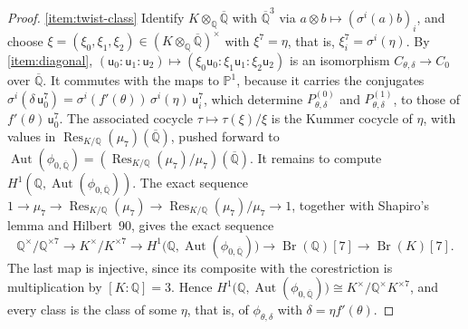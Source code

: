 \documentclass[12pt]{amsart}
\renewcommand{\P}{\mathbb{P}}
\newcommand{\Q}{\mathbb{Q}}
\newcommand{\Qbar}{{\overline{\Q}}}
\newcommand{\Pone}{\P^{1}}
\newcommand{\sfu}{\mathsf{u}}
\DeclareMathOperator{\Aut}{Aut}
\DeclareMathOperator{\Br}{Br}
\DeclareMathOperator{\Res}{Res}
\numberwithin{equation}{section}
\theoremstyle{definition}
\begin{document}
\begin{proof}
  \eqref{item:twist-class} Identify $K \otimes_{\Q} \Qbar$ with $\Qbar^{3}$ via
  $a \otimes b \mapsto (\sigma^{i}(a)b)_i$, and choose $\xi =
  (\xi_0,\xi_1,\xi_2) \in (K \otimes_{\Q} \Qbar)^{\times}$ with
  $\xi^7 = \eta$, that is, $\xi_i^7 = \sigma^{i}(\eta)$. By
  \eqref{item:diagonal}, $(\sfu_0:\sfu_1:\sfu_2) \mapsto
  (\xi_0\sfu_0:\xi_1\sfu_1:\xi_2\sfu_2)$ is an isomorphism
  $C_{\theta,\delta} \to C_0$ over $\Qbar$. It commutes with the maps to
  $\Pone$, because it carries the conjugates $\sigma^{i}(\delta\,\sfu_0^7) =
  \sigma^{i}(f'(\theta))\,\sigma^{i}(\eta)\,\sfu_i^7$, which determine
  $P^{(0)}_{\theta,\delta}$ and $P^{(1)}_{\theta,\delta}$, to those of
  $f'(\theta)\,\sfu_0^7$. The associated cocycle $\tau \mapsto \tau(\xi)/\xi$
  is the Kummer cocycle of $\eta$, with values in $\Res_{K/\Q}(\mu_7)(\Qbar)$,
  pushed forward to $\Aut(\phi_{0,\Qbar}) = (\Res_{K/\Q}(\mu_7)/\mu_7)(\Qbar)$. It
  remains to compute $H^1(\Q,\Aut(\phi_{0,\Qbar}))$. The exact sequence $1 \to \mu_7 \to \Res_{K/\Q}(\mu_7) \to
  \Res_{K/\Q}(\mu_7)/\mu_7 \to 1$, together with Shapiro's lemma and Hilbert~90,
  gives the exact sequence
  \[
    \Q^{\times}/\Q^{\times 7} \to K^{\times}/K^{\times 7} \to
    H^1\bigl(\Q, \Aut(\phi_{0,\Qbar})\bigr) \to \Br(\Q)[7] \to \Br(K)[7] .
  \]
  The last map is injective, since its composite with the corestriction is
  multiplication by $[K:\Q] = 3$.
  Hence $H^1\bigl(\Q,\Aut(\phi_{0,\Qbar})\bigr) \cong
  K^{\times}/\Q^{\times}K^{\times 7}$, and every class is the class of some
  $\eta$, that is, of $\phi_{\theta,\delta}$ with $\delta = \eta f'(\theta)$.


\end{proof}
\end{document}
